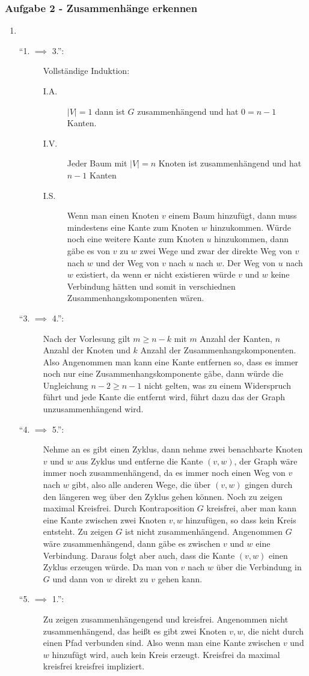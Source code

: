 \documentclass[11pt]{scrartcl}
\newcommand{\task}[1]{\subsubsection*{#1}}
\begin{document}
\task{Aufgabe 2 - Zusammenhänge erkennen}
\begin{enumerate}[label=(\alph*)]
	\item ~
		\begin{description}
			\item[``1. $ \implies  $ 3.'':]
				Vollständige Induktion:
				\begin{description}
					\item[I.A.] $ \left| V \right| = 1 $ dann ist $ G $ zusammenhängend und hat $ 0 = n - 1 $ Kanten.
					\item[I.V.] Jeder  Baum mit $ \left| V \right| = n $ Knoten ist zusammenhängend und hat $ n - 1 $ Kanten
					\item[I.S.] Wenn man einen Knoten $ v $ einem Baum hinzufügt, dann muss mindestens eine Kante zum Knoten $ w $ hinzukommen.
						Würde noch eine weitere Kante zum Knoten $ u $ hinzukommen, dann gäbe es von $ v $ zu $ w $ zwei Wege und zwar der direkte Weg von $ v $ nach $ w $ und der Weg von $ v $ nach $ u $ nach $ w $.
						Der Weg von $ u $ nach $ w $ existiert, da wenn er nicht existieren würde $ v $ und $ w $ keine Verbindung hätten und somit in verschiednen Zusammenhangskomponenten wären.
				\end{description}
			\item[``3. $ \implies  $ 4.'':]
				Nach der Vorlesung gilt $ m \geq n - k $ mit $ m $ Anzahl der Kanten, $ n $ Anzahl der Knoten und $ k $ Anzahl der Zusammenhangskomponenten.
				Also Angenommen man kann eine Kante entfernen so, dass es immer noch nur eine Zusammenhangskomponente gäbe, dann würde die Ungleichung $ n - 2 \geq n - 1 $ nicht gelten, was zu einem Widerspruch führt und jede Kante die entfernt wird, führt dazu das der Graph unzusammenhängend wird.
			\item[``4. $ \implies  $ 5.'':]
				Nehme an es gibt einen Zyklus, dann nehme zwei benachbarte Knoten $ v $ und $ w $ aus Zyklus und entferne die Kante $ (v, w) $, der Graph wäre immer noch zusammenhängend, da es immer noch einen Weg von $ v $ nach $ w $ gibt, also alle anderen Wege, die über $ (v, w) $ gingen durch den längeren weg über den Zyklus gehen können.
				Noch zu zeigen maximal Kreisfrei.
				Durch Kontraposition $ G $ kreisfrei, aber man kann eine Kante zwischen zwei Knoten $ v, w $ hinzufügen, so dass kein Kreis entsteht.
				Zu zeigen $ G $ ist nicht zusammenhängend.
				Angenommen $ G $ wäre zusammenhängend, dann gäbe es zwischen $ v $ und $ w $ eine Verbindung.
				Daraus folgt aber auch, dass die Kante $ (v, w) $ einen Zyklus erzeugen würde. Da man von $ v $ nach $ w $ über die Verbindung in $ G $ und dann von $ w $ direkt zu $ v $ gehen kann.
			\item[``5. $ \implies  $ 1.'':] Zu zeigen zusammenhängengend und kreisfrei.
				Angenommen nicht zusammenhängend, das heißt es gibt zwei Knoten $ v, w $, die nicht durch einen Pfad verbunden sind.
				Also wenn man eine Kante zwischen $ v $ und $ w $ hinzufügt wird, auch kein Kreis erzeugt.
				Kreisfrei da maximal kreisfrei kreisfrei impliziert.
		\end{description}
		

\end{enumerate}
\end{document}
